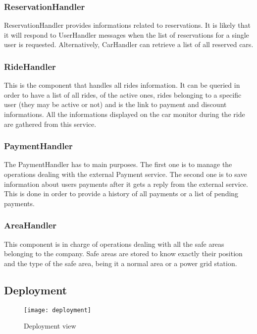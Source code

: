 \subsubsection{ReservationHandler}
ReservationHandler provides informations related to reservations. It is likely that it will
respond to UserHandler messages when the list of reservations for a single user is requested.
Alternatively, CarHandler can retrieve a list of all reserved cars. 

\subsubsection{RideHandler}
This is the component that handles all rides information. It can be queried in order to have
a list of all rides, of the active ones, rides belonging to a specific user
(they may be active or not) and is the link to payment and discount informations. All the informations
displayed on the car monitor during the ride are gathered from this service.

\subsubsection{PaymentHandler}
The PaymentHandler has to main purposes. The first one is to manage the operations dealing
with the external Payment service. The second one is to save information about users payments
after it gets a reply from the external service. 
This is done in order to provide a history of all payments or a list of pending payments.


\subsubsection{AreaHandler}
This component is in charge of operations dealing with all the safe areas belonging to the company.
Safe areas are stored to know exactly their position and the type of the safe area, being it
a normal area or a power grid station.

\pagebreak

\subsection{Deployment}

\begin{sidewaysfigure}
\centering
\texttt{[image: deployment]}
\caption{Deployment view}
\label{fig:depl}
\end{sidewaysfigure}

